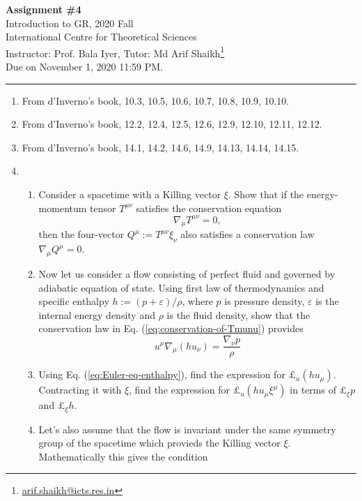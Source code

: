 \documentclass{article}
\begin{document}
\begin{center}
  {\bfseries Assignment \#4}\\
  Introduction to GR, 2020 Fall\\
  International Centre for Theoretical Sciences\\
  Instructor: Prof. Bala Iyer, Tutor: Md Arif Shaikh\footnote{\href{mailto: arif.shaikh@icts.res.in}{arif.shaikh@icts.res.in}}\\
  Due on November 1, 2020 11:59 PM.
\end{center}
\hrule

\begin{enumerate}
\item From d'Inverno's book, 10.3, 10.5, 10.6, 10.7, 10.8, 10.9, 10.10.
\item From d'Inverno's book, 12.2, 12.4, 12.5, 12.6, 12.9, 12.10, 12.11, 12.12.
\item From d'Inverno's book, 14.1, 14.2, 14.6, 14.9, 14.13, 14.14, 14.15.
\item
  \begin{enumerate}
  \item Consider a spacetime with a Killing vector $\xi$. Show that if
    the energy-momentum tensor $T^{\mu\nu}$ satisfies the conservation
    equation
    \begin{equation}
      \label{eq:conservation-of-Tmunu}
      \nabla_\mu T^{\mu\nu} = 0,
    \end{equation}
    then the four-vector $Q^\mu := T^{\mu\nu}\xi_\nu$ also satisfies a conservation law $\nabla_\mu Q^\mu = 0$.
  \item Now let us consider a flow consisting of perfect fluid and governed by adiabatic equation of state. Using first law of thermodynamics and specific enthalpy $h := (p + \varepsilon)/\rho$, where $p$ is pressure density, $\varepsilon$ is the internal energy density and $\rho$ is the fluid density, show that the conservation law in Eq. (\ref{eq:conservation-of-Tmunu}) provides
    \begin{equation}
      \label{eq:Euler-eq-enthalpy}
      u^\mu \nabla_\mu (h u_\nu) = \frac{\nabla_\nu p}{\rho}
    \end{equation}
  \item Using Eq. (\ref{eq:Euler-eq-enthalpy}), find the expression for $\pounds_u(hu_\mu)$. Contracting it with $\xi$, find the expression for $\pounds_u(hu_\mu \xi^\mu)$ in terms of $\pounds_\xi p$ and $\pounds_\xi h$.
  \item 
    Let's also assume that the flow is invariant under the same symmetry group of the spacetime which provieds the Killing vector $\xi$. Mathematically this gives the condition

\end{enumerate}
\end{enumerate}
\end{document}
